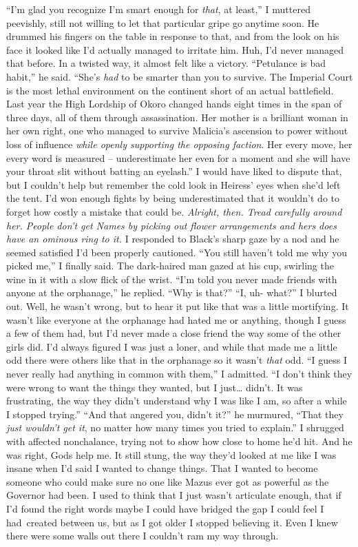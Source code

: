 \documentclass[12pt, openany]{book}
\begin{document}
“I’m glad you recognize I’m smart enough for \textit{that}, at least,” I muttered peevishly, still not willing to let that particular gripe go anytime soon.
He drummed his fingers on the table in response to that, and from the look on his face it looked like I’d actually managed to irritate him. Huh, I’d never managed that before. In a twisted way, it almost felt like a victory.
“Petulance is bad habit,” he said. “She’s \textit{had} to be smarter than you to survive. The Imperial Court is the most lethal environment on the continent short of an actual battlefield. Last year the High Lordship of Okoro changed hands eight times in the span of three days, all of them through assassination. Her mother is a brilliant woman in her own right, one who managed to survive Malicia’s ascension to power without loss of influence \textit{while openly supporting the opposing faction}. Her every move, her every word is measured – underestimate her even for a moment and she will have your throat slit without batting an eyelash.”
I would have liked to dispute that, but I couldn’t help but remember the cold look in Heiress’ eyes when she’d left the tent. I’d won enough fights by being underestimated that it wouldn’t do to forget how costly a mistake that could be. \textit{Alright, then. Tread carefully around her. People don’t get Names by picking out flower arrangements and hers does have an ominous ring to it.} I responded to Black’s sharp gaze by a nod and he seemed satisfied I’d been properly cautioned.
“You still haven’t told me why you picked me,” I finally said.
The dark-haired man gazed at his cup, swirling the wine in it with a slow flick of the wrist.
“I’m told you never made friends with anyone at the orphanage,” he replied. “Why is that?”
“I, uh- what?” I blurted out.
Well, he wasn’t wrong, but to hear it put like that was a little mortifying. It wasn’t like everyone at the orphanage had hated me or anything, though I guess a few of them had, but I’d never made a close friend the way some of the other girls did. I’d always figured I was just a loner, and while that made me a little odd there were others like that in the orphanage so it wasn’t \textit{that} odd.
“I guess I never really had anything in common with them,” I admitted. “I don’t think they were wrong to want the things they wanted, but I just… didn’t. It was frustrating, the way they didn’t understand why I was like I am, so after a while I stopped trying.”
“And that angered you, didn’t it?” he murmured, “That they \textit{just wouldn’t get it}, no matter how many times you tried to explain.”
I shrugged with affected nonchalance, trying not to show how close to home he’d hit. And he was right, Gods help me. It still stung, the way they’d looked at me like I was insane when I’d said I wanted to change things. That I wanted to become someone who could make sure no one like Mazus ever got as powerful as the Governor had been. I used to think that I just wasn’t articulate enough, that if I’d found the right words maybe I could have bridged the gap I could feel I had created between us, but as I got older I stopped believing it. Even I knew there were some walls out there I couldn’t ram my way through.
\end{document}
